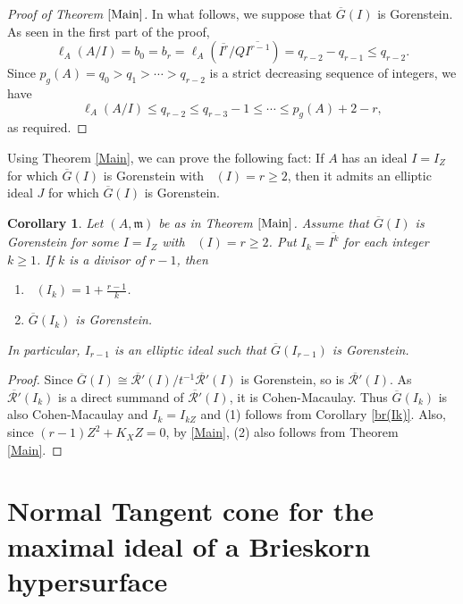 \documentclass[12pt]{amsart}
\newtheorem{cor}[thm]{Corollary}
\theoremstyle{definition}
\theoremstyle{remark}
\numberwithin{equation}{section}
\DeclareMathOperator{\br}{\bar r}
\newcommand{\m}{\mathfrak m}
\renewcommand{\:}{\colon}
\begin{document}
\begin{proof}[Proof of Theorem $\ref{Main}$]
\par \vspace{2mm}
In what follows, we suppose that $\overline{G}(I)$ is Gorenstein. 
As seen in the first part of the proof,
\[
\ell_A(A/I)=b_0=b_r
=\ell_A(\overline{I^{r}}/Q \overline{I^{r-1}})
=q_{r-2}-q_{r-1} \le q_{r-2}. 
\]
Since 
$p_g(A)=q_0 > q_1 > \cdots > q_{r-2}$ is a strict decreasing sequence
of integers, we have 
\[
\ell_A(A/I) \le  q_{r-2} \le q_{r-3}-1 \le \cdots \le p_g(A)+2-r,
\]
as required. 
\end{proof}

\par \vspace{2mm}
Using Theorem \ref{Main}, we can prove the following fact:
If $A$ has an ideal $I=I_Z$ for which $\overline{G}(I)$ is Gorenstein 
with $\br(I) =r \ge 2$, then it admits an elliptic ideal $J$ 
for which $\overline{G}(I)$ is Gorenstein. 

\begin{cor} \label{VerNTC}
Let $(A,\m)$ be as in Theorem $\ref{Main}$. 
Assume that $\overline{G}(I)$ is Gorenstein for some $I=I_Z$ with 
$\br(I)=r \ge 2$. 
Put $I_k=\overline{I^k}$ for each integer $k \ge 1$. 
If $k$ is a  divisor of $r-1$, then 
\begin{enumerate}
\item $\br(I_k)=1+\frac{r-1}{k}$. 
\item $\overline{G}(I_k)$ is Gorenstein. 
\end{enumerate}
In particular, $I_{r-1}$ is an elliptic ideal such that 
$\overline{G}(I_{r-1})$ is Gorenstein.  
\end{cor}

\begin{proof}
Since $\overline{G}(I) \cong \overline{\mathcal{R}'}(I)/t^{-1} \overline{\mathcal{R}'}(I)$ is Gorenstein, 
so is $\overline{\mathcal{R}'}(I)$. 
As $ \overline{\mathcal{R}'}(I_k)$ is 
a direct summand of $ \overline{\mathcal{R}'}(I)$, 
it is Cohen-Macaulay. 
Thus $\overline{G}(I_k)$ is also Cohen-Macaulay and $I_k=I_{kZ}$
and (1) follows from  Corollary \ref{br(Ik)}. 
Also, since $(r-1)Z^2 + K_XZ = 0$, by \ref{Main}, (2) also follows from 
Theorem \ref{Main}.
\end{proof}


\bigskip
\section{Normal Tangent cone for the maximal ideal of a Brieskorn hypersurface}
\end{document}
